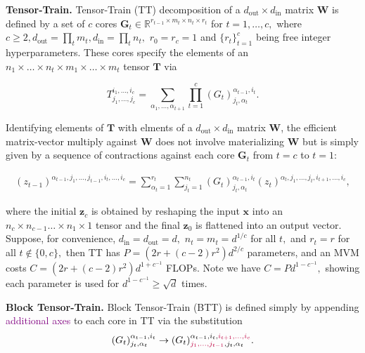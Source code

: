 \documentclass{article}
\newcommand{\mbf}[1]{{\boldsymbol{\mathbf{#1}}}}
\newcommand{\bm}{\mbf}
\theoremstyle{plain}
\theoremstyle{definition}
\theoremstyle{remark}
\newcommand{\tc}[1]{\textcolor{purple}{#1}}
\newcommand{\din}{{d_\mathrm{in}}}
\newcommand{\dout}{{d_\mathrm{out}}}
\begin{document}
%
%
%
%
%
%
%
%
%
%
%
%
%
%
%
%
%
%
%
%
%
%
%
%
%
%
%
%
%
%
%
%
%
%
%
%

%
%
%
%
%
%

\noindent \textbf{Tensor-Train.} \quad
Tensor-Train (TT) decomposition of a $\dout \times \din$ matrix $\bm{W}$ is defined by a set of $c$ cores $\bm{G}_t \in \mathbb{R}^{r_{t-1} \times  m_{t} \times  n_{t} \times  r_{t}}$
for $t=1, \dots, c,$ where $c \geq 2, \dout = \prod_{t}^{} m_{t}, \din = \prod_{t}^{} n_{t},$ $r_{0} = r_{c} = 1$ and $\{r_t\}_{t=1}^{c}$ being free integer hyperparameters. These cores specify the elements of an
$n_1 \times \ldots \times n_t \times m_1 \times \ldots \times m_t$ tensor $\bm{T}$ via

\begin{equation}
    T^{i_1, \ldots, i_c}_{j_1, \ldots, j_c} = \sum_{\alpha_1, \ldots, \alpha_{t+1}} \prod_{t=1}^{c} (G_t)^{\alpha_{t-1}, i_t}_{ j_t, \alpha_t}.
\end{equation}

Identifying elements of $\bm{T}$ with elments of a $\dout \times \din$ matrix $\bm{W}$, the efficient matrix-vector multiply against $\bm{W}$ does not involve materializing $\bm{W}$ but is simply given by a sequence of contractions against each core $\bm{G}_t$ from $t=c$ to $t=1:$

\begin{equation} \label{eq:full}
    \begin{split}
      (z_{t-1})^{\alpha_{t-1}, j_1, \ldots, j_{t-1}, i_t, \ldots, i_c} = \sum_{\alpha_t=1}^{r_t}  \sum_{j_t=1}^{n_t} (G_t)^{\alpha_{t-1}, i_t}_{j_t, \alpha_t} (z_t)^{\alpha_t, j_1, \ldots, j_t, i_{t+1}, \ldots, i_c},
    \end{split}
\end{equation}

where the initial $\bm{z}_c$ is obtained by reshaping the input $\bm{x}$ into an $n_c \times n_{c-1} \ldots \times n_1 \times 1$ tensor and the final $\bm{z}_0$ is flattened into an output vector. Suppose, for convenience, $\din=\dout=d,$ $n_t = m_t = d^{1/c}$ for all $t,$ and $r_t = r$ for all $t \notin \{0, c\},$ then TT has $P=(2r + (c-2) r^2) d^{2/c}$ parameters, and an MVM costs $C=(2r + (c-2) r^2) d^{1+c^{-1}}$ FLOPs. Note we have $C = P d^{1 - c^{-1}},$ showing each parameter is used for $d^{1 - c^{-1}} \geq \sqrt{d}$ times.

\noindent \textbf{Block Tensor-Train.} \quad
Block Tensor-Train (BTT) is defined simply by appending \tc{additional axes} to each core in TT via the substitution
\begin{equation}
    (G_t)^{\alpha_{t-1}, i_t}_{j_t, \alpha_t} \to (G_t)^{\alpha_{t-1}, i_t, \tc{i_{t+1}, \ldots, i_c}}_{\tc{j_1, \ldots, j_{t-1}}, j_t, \alpha_{t}}.
\end{equation}
\end{document}
